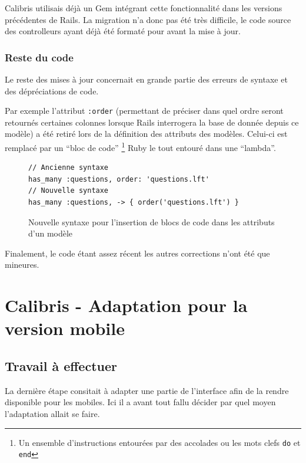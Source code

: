 \documentclass[12pt,a4paper]{book}
\begin{document}
Calibris utilisais déjà un Gem intégrant cette fonctionnalité dans les versions précédentes de Rails. La migration n'a donc pas été très difficile, le code source des controlleurs ayant déjà été formaté pour avant la mise à jour.
    
\subsubsection{Reste du code}

Le reste des mises à jour concernait en grande partie des erreurs de syntaxe et des dépréciations de code.

Par exemple l'attribut \texttt{:order} (permettant de préciser dans quel ordre seront retournés certaines colonnes lorsque Rails interrogera la base de donnée depuis ce modèle) a été retiré lors de la définition des attributs des modèles. Celui-ci est remplacé par un ``bloc de code'' \footnote{Un ensemble d'instructions entourées par des accolades ou les mots clefs \texttt{do} et \texttt{end}} Ruby le tout entouré dans une ``lambda''.

    \begin{figure}[h]
    \lstset{language=ruby}
    \begin{lstlisting}
// Ancienne syntaxe
has_many :questions, order: 'questions.lft'
// Nouvelle syntaxe
has_many :questions, -> { order('questions.lft') }
    \end{lstlisting}
     \caption{Nouvelle syntaxe pour l'insertion de blocs de code dans les attributs d'un modèle}
    \end{figure}
    
Finalement, le code étant assez récent les autres corrections n'ont été que mineures.

\section{Calibris - Adaptation pour la version mobile}

\subsection{Travail à effectuer}

La dernière étape consitait à adapter une partie de l'interface afin de la rendre disponible pour les mobiles. Ici il a avant tout fallu décider par quel moyen l'adaptation allait se faire.
\end{document}
